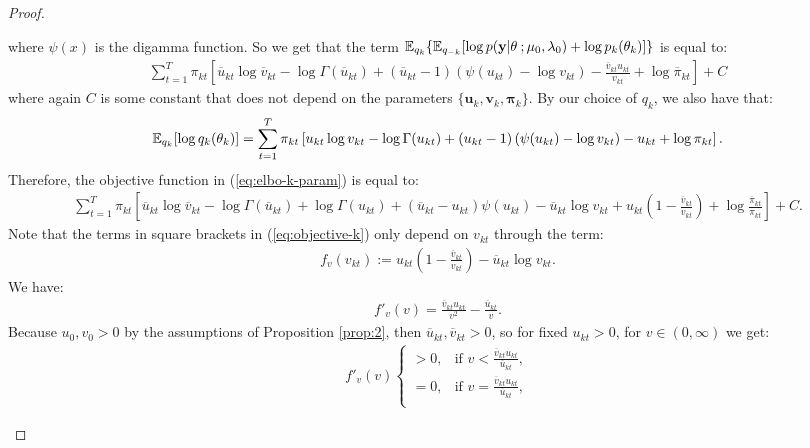 \begin{proof}
\begin{enumerate}[label=\roman*.]
where $\psi(x)$ is the digamma function. So we get that the term $\mathbb{E}_{q_k}\{\mathbb{E}_{q_{-k}}[\log p(\mathbf{y}| \theta\:; \mu_0,\lambda_0)+\log p_k(\theta_k)]\}$ is equal to:
\begin{align*}
    \sum_{t=1}^T \pi_{kt}\left[ \overline{u}_{kt} \log \overline{v}_{kt} -  \log\Gamma(\overline{u}_{kt}) + \left(\overline{u}_{kt} -1\right)(\psi(u_{kt}) - \log v_{kt}) - \frac{\overline{v}_{kt} u_{kt}}{v_{kt}} + \log \overline{\pi}_{kt}\right] + C
\end{align*}
where again $C$ is some constant that does not depend on the parameters $\{\mathbf{u}_k, \mathbf{v}_k, \boldsymbol{\pi}_k\}$. By our choice of $q_k$, we also have that:
\begin{align*}
    \mathbb{E}_{q_k}[\log q_k(\theta_k)] = \sum_{t=1}^T \pi_{kt}\left[ u_{kt} \log v_{kt} -  \log\Gamma(u_{kt}) + \left(u_{kt} -1\right)(\psi(u_{kt}) - \log v_{kt}) - u_{kt} + \log \pi_{kt}\right].
\end{align*}
Therefore, the objective function in (\ref{eq:elbo-k-param}) is equal to:
\small
\begin{align}
    \sum_{t=1}^T \pi_{kt}\left[ \overline{u}_{kt} \log \overline{v}_{kt} - \log\Gamma(\overline{u}_{kt}) + \log\Gamma(u_{kt}) + \left(\overline{u}_{kt} -u_{kt}\right)\psi(u_{kt}) - \overline{u}_{kt} \log v_{kt} + u_{kt}\left(1 - \frac{\overline{v}_{kt} }{v_{kt}}\right) + \log \frac{\overline{\pi}_{kt}}{\pi_{kt}}\right] +C.\label{eq:objective-k}
\end{align}
\normalsize
Note that the terms in square brackets in (\ref{eq:objective-k}) only depend on $v_{kt}$ through the term: 
\begin{align*}
     f_v(v_{kt}) := u_{kt}\left(1- \frac{\overline{v}_{kt} }{v_{kt}}\right) - \overline{u}_{kt} \log v_{kt}.
\end{align*}
We have:
\begin{align*}
    f'_v(v) = \frac{\overline{v}_{kt} u_{kt}}{v^2} -\frac{\overline{u}_{kt}}{v}.
\end{align*}
Because $u_0, v_0 > 0$ by the assumptions of Proposition \ref{prop:2}, then $\overline{u}_{kt},\overline{v}_{kt} > 0$, so for fixed $u_{kt} >0$, for $v\in(0,\infty)$ we get:
\begin{align*}f'_v(v)
    \begin{cases}
        > 0, & \text{if } v < \frac{\overline{v}_{kt} u_{kt}}{\overline{u}_{kt}}, \\ 
        = 0, & \text{if } v = \frac{\overline{v}_{kt} u_{kt}}{\overline{u}_{kt}}, \\  

\end{cases}
\end{align*}
\end{enumerate}
\end{proof}
